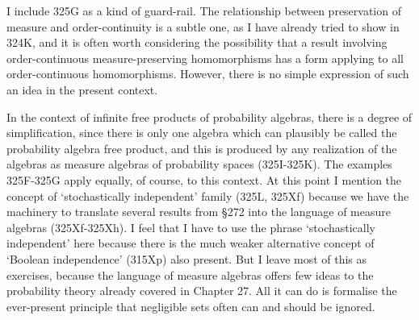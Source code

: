 {I include 325G as a kind of guard-rail.   The relationship between
preservation of measure and order-continuity is a subtle one, as I have
already tried to show in 324K, and it is often worth considering the
possibility that a result involving order-continuous measure-preserving
homomorphisms has a form applying to all order-continuous homomorphisms.
However, there is no simple expression of such an idea in the present
context.

In the context of infinite free products of probability algebras, there
is a degree of simplification, since there is only one algebra which can
plausibly be called the probability algebra free product, and this is
produced by any realization of the algebras as measure algebras of
probability spaces (325I-325K).   The examples 325F-325G apply equally,
of course, to this context.   At this point I mention the concept of
`stochastically independent' family (325L, 325Xf) because we have the
machinery to translate several results from \S272 into the language of
measure algebras (325Xf-325Xh).   I feel that I have to use the phrase
`stochastically independent' here because there is the much weaker
alternative concept of `Boolean independence' (315Xp) also present.
But I leave most of this as exercises, because the language of measure
algebras offers few ideas to the probability theory already covered in
Chapter 27.   All it can do is formalise the ever-present principle that
negligible sets often can and should be ignored.
}%

\discrpage

